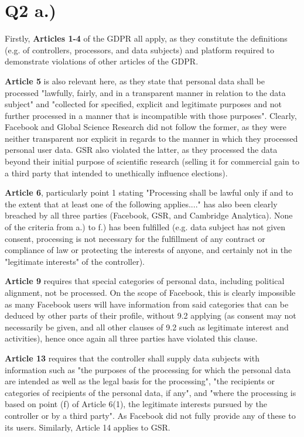\documentclass[a4paper]{article}
\begin{document}
\section*{Q2 a.)}

Firstly, \textbf{Articles 1-4} of the GDPR all apply, as they constitute the definitions (e.g. of controllers, processors, and data subjects) and platform required to demonstrate violations of other articles of the GDPR.

\textbf{Article 5} is also relevant here, as they state that personal data shall be processed "lawfully, fairly, and in a transparent manner in relation to the data subject" and "collected for specified, explicit and legitimate purposes and not further processed in a manner that is incompatible with those purposes". Clearly, Facebook and Global Science Research did not follow the former, as they were neither transparent nor explicit in regards to the manner in which they processed personal user data. GSR also violated the latter, as they processed the data beyond their initial purpose of scientific research (selling it for commercial gain to a third party that intended to unethically influence elections).

\textbf{Article 6}, particularly point 1 stating "Processing shall be lawful only if and to the extent that at least one of the following applies...." has also been clearly breached by all three parties (Facebook, GSR, and Cambridge Analytica). None of the criteria from a.) to f.) has been fulfilled (e.g. data subject has not given consent, processing is not necessary for the fulfillment of any contract or compliance of law or protecting the interests of anyone, and certainly not in the "legitimate interests" of the controller).

\textbf{Article 9} requires that special categories of personal data, including political alignment, not be processed. On the scope of Facebook, this is clearly impossible as many Facebook users will have information from said categories that can be deduced by other parts of their profile, without 9.2 applying (as consent may not necessarily be given, and all other clauses of 9.2 such as legitimate interest and activities), hence once again all three parties have violated this clause.

\textbf{Article 13} requires that the controller shall supply data subjects with information such as "the purposes of the processing for which the personal data are intended as well as the legal basis for the processing", "the recipients or categories of recipients of the personal data, if any", and "where the processing is based on point (f) of Article 6(1), the legitimate interests pursued by the controller or by a third party". As Facebook did not fully provide any of these to its users. Similarly, Article 14 applies to GSR.
\end{document}
